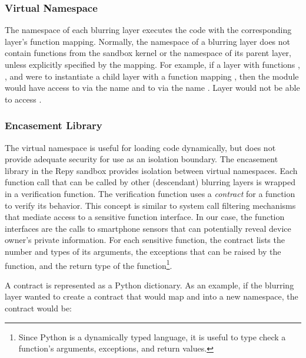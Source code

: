 \subsubsection{Virtual Namespace}

The namespace of each blurring layer executes the code with the 
corresponding layer's function mapping. Normally, the namespace of a 
blurring layer does not contain functions from the sandbox kernel or 
the namespace of its parent layer, unless explicitly specified by the 
mapping. For example, if a layer  with functions , 
, and  
were to instantiate a child layer  with a function mapping 
, 
then the module  would have access
to  via the name  and to
 via the name 
. Layer  would not be able to 
access .

\subsubsection{Encasement Library}

The virtual namespace is useful for loading
code dynamically, but does not provide adequate security for
use as an isolation boundary. The encasement library in the 
Repy sandbox provides isolation between virtual namespaces. 
%
Each function call that can be called by other (descendant) blurring
layers is wrapped in a verification function. The verification 
function uses a \textit{contract} for a function to verify its
behavior.  This concept is similar to system call filtering
mechanisms~\cite{acharya2000mapbox, fraser2000hardening} 
that mediate access to a sensitive function interface. In our case, 
the function interfaces are the calls to smartphone sensors that 
can potentially reveal device owner's private information. 
For each sensitive function, the contract lists the number 
and types of its arguments, the exceptions that can be raised 
by the function, and the return type of the function\footnote{Since 
Python is a dynamically typed language, it is useful to type check 
a function's arguments, exceptions, and return values.}.

A contract is represented as a Python dictionary. As an example, if 
the blurring layer  wanted to create a contract that would map
 and  into 
a new namespace, the contract would be: 


